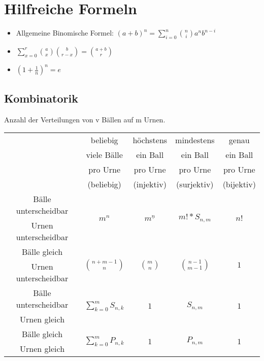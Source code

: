 \section{Hilfreiche Formeln}

\begin{itemize}
\item Allgemeine Binomische Formel: $(a+b)^n=\sum^n_{i=0}\binom {n}{i}a^nb^{n-i}$
\item $\sum^r_{x=0}\binom{a}{x}\binom{b}{r-x}=\binom{a+b}{r}$
\item $\left(1+\frac{1}{n}\right)^n=e$
\end{itemize}

\subsection{Kombinatorik}
Anzahl der Verteilungen von v Bällen auf m Urnen.\\
\begin{tabular}{|c||c|c|c|c|}
\hline
&beliebig &höchstens &mindestens&genau\\
&viele Bälle&ein Ball& ein Ball& ein Ball\\
& pro Urne& pro Urne& pro Urne& pro Urne\\
& (beliebig)& (injektiv) & (surjektiv)& (bijektiv)\\
\hline
\hline
Bälle unterscheidbar& \multirow{2}{*}{$m^n$} &\multirow{2}{*}{$m^\underline{n}$} &\multirow{2}{*}{$m!*S_{n,m}$} &\multirow{2}{*}{$n!$}\\
Urnen unterscheidbar &&&&\\
\hline
Bälle gleich& \multirow{2}{*}{$\binom{n+m-1}{n}$} &\multirow{2}{*}{$\binom{m}{n}$} &\multirow{2}{*}{$\binom{n-1}{m-1}$} &\multirow{2}{*}{$1$}\\
Urnen unterscheidbar &&&&\\
\hline
Bälle unterscheidbar& \multirow{2}{*}{$\sum^m_{k=0}S_{n,k}$} &\multirow{2}{*}{$1$} &\multirow{2}{*}{$S_{n,m}$} &\multirow{2}{*}{$1$}\\
Urnen gleich &&&&\\
\hline
Bälle gleich& \multirow{2}{*}{$\sum^m_{k=0}P_{n,k}$} &\multirow{2}{*}{$1$} &\multirow{2}{*}{$P_{n,m}$} &\multirow{2}{*}{$1$}\\
Urnen gleich &&&&\\
\hline
\end{tabular}
